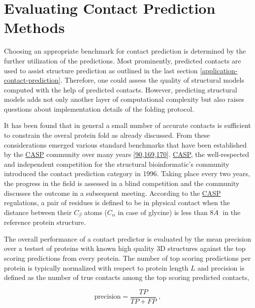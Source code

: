 \documentclass[11pt,a4paper,twoside]{book}
\newcommand{\Cb}{C_\beta}
\newcommand{\angstrom}{\mathring{A} \;}
\theoremstyle{definition}
\theoremstyle{definition}
\theoremstyle{remark}
\begin{document}
\section{Evaluating Contact Prediction
Methods}\label{intro-cp-evaluation}

Choosing an appropriate benchmark for contact prediction is determined
by the further utilization of the predictions. Most prominently,
predicted contacts are used to assist structure prediction as outlined
in the last section \ref{application-contact-prediction}. Therefore, one
could assess the quality of structural models computed with the help of
predicted contacts. However, predicting structural models adds not only
another layer of computational complexity but also raises questions
about implementation details of the folding protocol.

It has been found that in general a small number of accurate contacts is
sufficient to constrain the overal protein fold as already discussed.
From these considerations emerged various standard benchmarks that have
been established by the \protect\hyperlink{abbrev}{CASP} community over
many years
{[}\protect\hyperlink{ref-Monastyrskyy2015}{90},\protect\hyperlink{ref-Monastyrskyy2011}{169},\protect\hyperlink{ref-Monastyrskyy2014a}{170}{]}.
\protect\hyperlink{abbrev}{CASP}, the well-respected and independent
competition for the structural bioinformatic's community introduced the
contact prediction category in 1996. Taking place every two years, the
progress in the field is assessed in a blind competition and the
community discusses the outcome in a subsequent meeting. According to
the \protect\hyperlink{abbrev}{CASP} regulations, a pair of residues is
defined to be in physical contact when the distance between their
\(\Cb\) atoms (\(C_{\alpha}\) in case of glycine) is less than
\(8 \angstrom\) in the reference protein structure.

The overall performance of a contact predictor is evaluated by the mean
precision over a testset of proteins with known high quality 3D
structures against the top scoring predictions from every protein. The
number of top scoring predictions per protein is typically normalized
with respect to protein length \(L\) and precision is defined as the
number of true contacts among the top scoring predicted contacts,

\begin{equation}
    \textrm{precision}  = \frac{TP}{TP + FP} \; ,
\end{equation}
\end{document}
